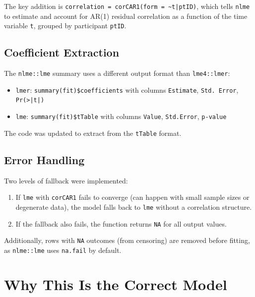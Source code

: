 \documentclass[11pt]{article}
\begin{document}
The key addition is
\texttt{correlation = corCAR1(form = \textasciitilde t|ptID)},
which tells \texttt{nlme} to estimate and account for AR(1)
residual correlation as a function of the time variable
\texttt{t}, grouped by participant \texttt{ptID}.

\subsection{Coefficient Extraction}

The \texttt{nlme::lme} summary uses a different output
format than \texttt{lme4::lmer}:

\begin{itemize}
\item \texttt{lmer}: \texttt{summary(fit)\$coefficients}
  with columns \texttt{Estimate}, \texttt{Std. Error},
  \texttt{Pr(>|t|)}
\item \texttt{lme}: \texttt{summary(fit)\$tTable} with
  columns \texttt{Value}, \texttt{Std.Error},
  \texttt{p-value}
\end{itemize}

The code was updated to extract from the \texttt{tTable}
format.

\subsection{Error Handling}

Two levels of fallback were implemented:

\begin{enumerate}
\item If \texttt{lme} with \texttt{corCAR1} fails to
  converge (can happen with small sample sizes or
  degenerate data), the model falls back to \texttt{lme}
  without a correlation structure.
\item If the fallback also fails, the function returns
  \texttt{NA} for all output values.
\end{enumerate}

Additionally, rows with \texttt{NA} outcomes (from censoring)
are removed before fitting, as \texttt{nlme::lme} uses
\texttt{na.fail} by default.

\section{Why This Is the Correct Model}
\end{document}
